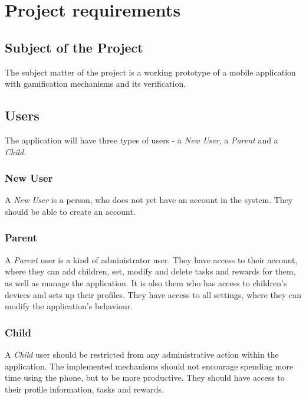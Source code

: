 \chapter{Project requirements}\label{ch:requirements}
\section{Subject of the Project}\label{sec:requirements:subject}
The subject matter of the project is a working prototype of a mobile application with gamification mechanisms and its verification.


\section{Users}\label{sec:requirements:users}
The application will have three types of users - a \textit{New User}, a \textit{Parent} and a \textit{Child}.

\subsection{New User}\label{subsec:requirements:users:new}
A \textit{New User} is a person, who does not yet have an account in the system. They should be able to create an account.

\subsection{Parent}\label{subsec:requirements:users:parent}
A \textit{Parent} user is a kind of administrator user. They have access to their account, where they can add children, set, modify and delete tasks and rewards for them, as well as manage the application. It is also them who has access to children's devices and sets up their profiles. They have access to all settings, where they can modify the application's behaviour.

\subsection{Child}\label{subsec:requirements:users:child}
A \textit{Child} user should be restricted from any administrative action within the application. The implemented mechanisms should not encourage spending more time using the phone, but to be more productive. They should have access to their profile information, tasks and rewards.


